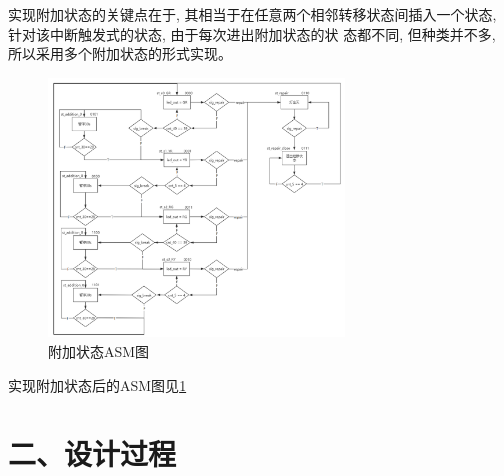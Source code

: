 \documentclass{article}
\newcommand{\fourhao}{\fontsize{14pt}{\baselineskip}\selectfont} %
\newcommand{\xiaosihao}{\fontsize{12pt}{\baselineskip}\selectfont} %
\begin{document}
实现附加状态的关键点在于, 其相当于在任意两个相邻转移状态间插入一个状态, 针对该中断触发式的状态, 由于每次进出附加状态的状
态都不同, 但种类并不多, 所以采用多个附加状态的形式实现。\\
\begin{figure}[htbp]
    \centering
    \includegraphics[width=0.7\textwidth]{image/2024-06-19-18-06-00.png}
    \caption{附加状态ASM图}
    \label{image_asm_3}
\end{figure}
实现附加状态后的ASM图见\ref{image_asm_3}
\section*{\fourhao 二、设计过程}
\xiaosihao
{}
\end{document}
